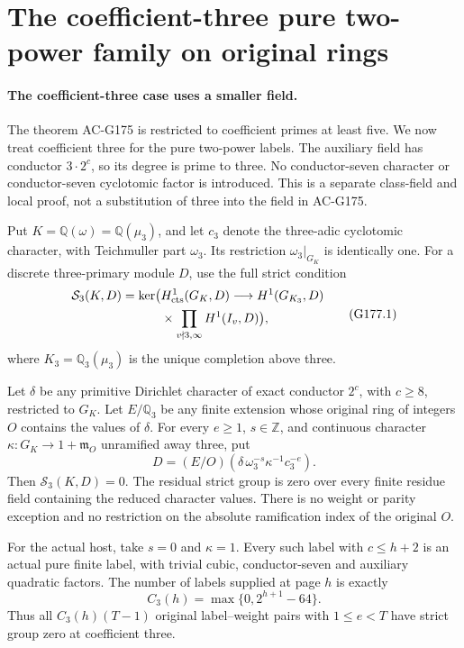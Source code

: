 \section{The coefficient-three pure two-power family on original rings}
\label{sec:coefficient-three-high-two}

\paragraph{The coefficient-three case uses a smaller field.}
The theorem AC-G175 is restricted to coefficient primes at least five.
We now treat coefficient three for the pure two-power labels.
The auxiliary field has conductor $3\cdot2^c$, so its degree is prime
to three.  No conductor-seven character or conductor-seven cyclotomic
factor is introduced.  This is a separate class-field and local proof,
not a substitution of three into the field in AC-G175.

Put $K=\mathbb Q(\omega)=\mathbb Q(\mu_3)$, and let $c_3$ denote the
three-adic cyclotomic character, with Teichmuller part $\omega_3$.
Its restriction $\omega_3|_{G_K}$ is identically one.
For a discrete three-primary module $D$, use the full strict condition
\[
 \begin{split}
 \mathcal S_3(K,D)=\ker\bigl(&H^1_{\rm cts}(G_K,D)\longrightarrow
 H^1(G_{K_3},D)\\
 &\times\prod_{v\nmid3,\infty}H^1(I_v,D)\bigr),
 \end{split}\tag{G177.1}
\]
where $K_3=\mathbb Q_3(\mu_3)$ is the unique completion above three.

\begin{theorem}
\label{AC-G177}
Let $\delta$ be any primitive Dirichlet character of exact conductor
$2^c$, with $c\geq8$, restricted to $G_K$.
Let $E/\mathbb Q_3$ be any finite extension whose original ring of
integers $O$ contains the values of $\delta$.
For every $e\geq1$, $s\in\mathbb Z$, and continuous character
$\kappa:G_K\to1+\mathfrak m_O$ unramified away three, put
\[
 D=(E/O)(\delta\,\omega_3^{-s}\kappa^{-1}c_3^{-e}).
 \tag{G177.2}
\]
Then $\mathcal S_3(K,D)=0$.
The residual strict group is zero over every finite residue field
containing the reduced character values.  There is no weight or
parity exception and no restriction on the absolute ramification
index of the original $O$.

For the actual host, take $s=0$ and $\kappa=1$.
Every such label with $c\leq h+2$ is an actual pure finite label,
with trivial cubic, conductor-seven and auxiliary quadratic factors.
The number of labels supplied at page $h$ is exactly
\[
 C_3(h)=\max\{0,2^{h+1}-64\}.
 \tag{G177.3}
\]
Thus all $C_3(h)(T-1)$ original label--weight pairs with
$1\leq e<T$ have strict group zero at coefficient three.
\end{theorem}

